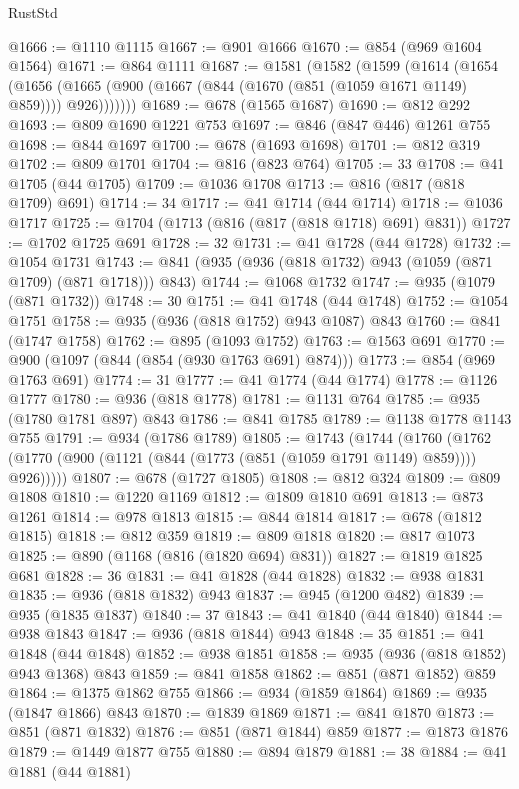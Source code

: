 \begin{lexlean}{RustStd}
\begin{coremodule}
@1666 := @1110 @1115
@1667 := @901 @1666
@1670 := @854 (@969 @1604 @1564)
@1671 := @864 @1111
@1687 := @1581
    (@1582
      (@1599
        (@1614
          (@1654
            (@1656 (@1665 (@900 (@1667 (@844 (@1670 (@851 (@1059 @1671 @1149) @859)))) @926)))))))
@1689 := @678 (@1565 @1687)
@1690 := @812 @292
@1693 := @809 @1690 @1221 @753
@1697 := @846 (@847 @446) @1261 @755
@1698 := @844 @1697
@1700 := @678 (@1693 @1698)
@1701 := @812 @319
@1702 := @809 @1701
@1704 := @816 (@823 @764)
@1705 := 33
@1708 := @41 @1705 (@44 @1705)
@1709 := @1036 @1708
@1713 := @816 (@817 (@818 @1709) @691)
@1714 := 34
@1717 := @41 @1714 (@44 @1714)
@1718 := @1036 @1717
@1725 := @1704 (@1713 (@816 (@817 (@818 @1718) @691) @831))
@1727 := @1702 @1725 @691
@1728 := 32
@1731 := @41 @1728 (@44 @1728)
@1732 := @1054 @1731
@1743 := @841 (@935 (@936 (@818 @1732) @943 (@1059 (@871 @1709) (@871 @1718))) @843)
@1744 := @1068 @1732
@1747 := @935 (@1079 (@871 @1732))
@1748 := 30
@1751 := @41 @1748 (@44 @1748)
@1752 := @1054 @1751
@1758 := @935 (@936 (@818 @1752) @943 @1087) @843
@1760 := @841 (@1747 @1758)
@1762 := @895 (@1093 @1752)
@1763 := @1563 @691
@1770 := @900 (@1097 (@844 (@854 (@930 @1763 @691) @874)))
@1773 := @854 (@969 @1763 @691)
@1774 := 31
@1777 := @41 @1774 (@44 @1774)
@1778 := @1126 @1777
@1780 := @936 (@818 @1778)
@1781 := @1131 @764
@1785 := @935 (@1780 @1781 @897) @843
@1786 := @841 @1785
@1789 := @1138 @1778 @1143 @755
@1791 := @934 (@1786 @1789)
@1805 := @1743
    (@1744
      (@1760 (@1762 (@1770 (@900 (@1121 (@844 (@1773 (@851 (@1059 @1791 @1149) @859)))) @926)))))
@1807 := @678 (@1727 @1805)
@1808 := @812 @324
@1809 := @809 @1808
@1810 := @1220 @1169
@1812 := @1809 @1810 @691
@1813 := @873 @1261
@1814 := @978 @1813
@1815 := @844 @1814
@1817 := @678 (@1812 @1815)
@1818 := @812 @359
@1819 := @809 @1818
@1820 := @817 @1073
@1825 := @890 (@1168 (@816 (@1820 @694) @831))
@1827 := @1819 @1825 @681
@1828 := 36
@1831 := @41 @1828 (@44 @1828)
@1832 := @938 @1831
@1835 := @936 (@818 @1832) @943
@1837 := @945 (@1200 @482)
@1839 := @935 (@1835 @1837)
@1840 := 37
@1843 := @41 @1840 (@44 @1840)
@1844 := @938 @1843
@1847 := @936 (@818 @1844) @943
@1848 := 35
@1851 := @41 @1848 (@44 @1848)
@1852 := @938 @1851
@1858 := @935 (@936 (@818 @1852) @943 @1368) @843
@1859 := @841 @1858
@1862 := @851 (@871 @1852) @859
@1864 := @1375 @1862 @755
@1866 := @934 (@1859 @1864)
@1869 := @935 (@1847 @1866) @843
@1870 := @1839 @1869
@1871 := @841 @1870
@1873 := @851 (@871 @1832)
@1876 := @851 (@871 @1844) @859
@1877 := @1873 @1876
@1879 := @1449 @1877 @755
@1880 := @894 @1879
@1881 := 38
@1884 := @41 @1881 (@44 @1881)

\end{coremodule}
\end{lexlean}
